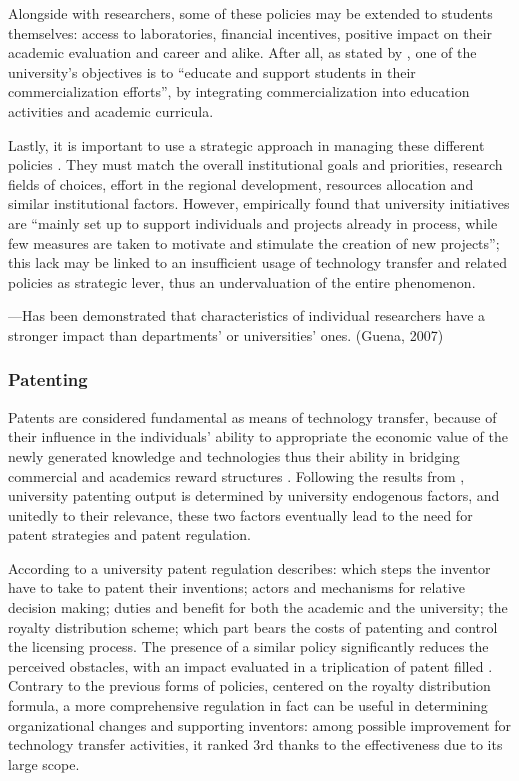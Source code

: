 Alongside with researchers, some of these policies may be extended to students themselves: access to laboratories, financial incentives, positive impact on their academic evaluation and career and alike. After all, as stated by \citet{Rasmussen2006}, one of the university's objectives is to \enquote{educate and support students in their commercialization efforts}, by integrating commercialization into education activities and academic curricula. 

Lastly, it is important to use a strategic approach in managing these different policies \citep{Siegel2007}. They must match the overall institutional goals and priorities, research fields of choices, effort in the regional development, resources allocation and similar institutional factors. However, \citet{Rasmussen2006} empirically found that university initiatives are \enquote{mainly set up to support individuals and projects already in process, while few measures are taken to motivate and stimulate the creation of new projects}; this lack may be linked to an insufficient usage of technology transfer and related policies as strategic lever, thus an undervaluation of the entire phenomenon.

---Has been demonstrated that characteristics of individual researchers have a stronger impact than departments' or universities' ones. (Guena, 2007)

\subsubsection{Patenting}

Patents are considered fundamental as means of technology transfer, because of their influence in the individuals' ability to appropriate the economic value of the newly generated knowledge and technologies \citep{Bercovitz2006} thus their ability in bridging commercial and academics reward structures \citep{OwenSmith2001}. Following the results from \citet{Tijssen2006}, university patenting output is determined by university endogenous factors, and unitedly to their relevance, these two factors eventually lead to the need for patent strategies \citep{Siegel2007} and patent regulation.

According to \citet{Baldini2007} a university patent regulation describes: which steps the inventor have to take to patent their inventions; actors and mechanisms for relative decision making; duties and benefit for both the academic and the university; the royalty distribution scheme; which part bears the costs of patenting and control the licensing process. The presence of a similar policy significantly reduces the perceived obstacles, with an impact evaluated in a triplication of patent filled \citep{Baldini2006,Baldini2007}. Contrary to the previous forms of policies, centered on the royalty distribution formula, a more comprehensive regulation in fact can be useful in determining organizational changes and supporting inventors: among possible improvement for technology transfer activities, it ranked 3rd thanks to the effectiveness due to its large scope. 

